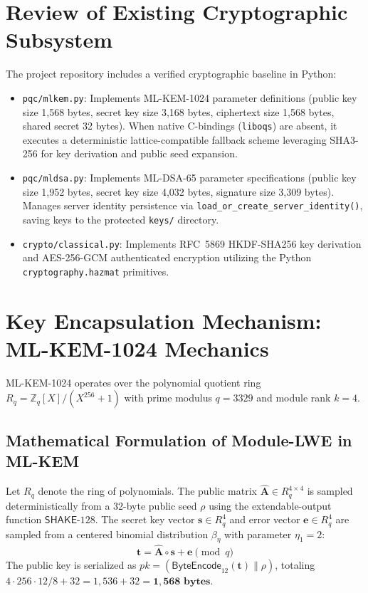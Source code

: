 \section{Review of Existing Cryptographic Subsystem}
\label{sec:existing_crypto_review}

The project repository includes a verified cryptographic baseline in Python:
\begin{itemize}
    \item \texttt{pqc/mlkem.py}: Implements ML-KEM-1024 parameter definitions (public key size 1,568 bytes, secret key size 3,168 bytes, ciphertext size 1,568 bytes, shared secret 32 bytes). When native C-bindings (\texttt{liboqs}) are absent, it executes a deterministic lattice-compatible fallback scheme leveraging SHA3-256 for key derivation and public seed expansion.
    \item \texttt{pqc/mldsa.py}: Implements ML-DSA-65 parameter specifications (public key size 1,952 bytes, secret key size 4,032 bytes, signature size 3,309 bytes). Manages server identity persistence via \texttt{load\_or\_create\_server\_identity()}, saving keys to the protected \texttt{keys/} directory.
    \item \texttt{crypto/classical.py}: Implements RFC~5869 HKDF-SHA256 key derivation and AES-256-GCM authenticated encryption utilizing the Python \texttt{cryptography.hazmat} primitives.
\end{itemize}

\section{Key Encapsulation Mechanism: ML-KEM-1024 Mechanics}
\label{sec:mlkem_detailed_mechanics}

ML-KEM-1024 operates over the polynomial quotient ring $R_q = \mathbb{Z}_q[X] / (X^{256} + 1)$ with prime modulus $q = 3329$ and module rank $k = 4$.

\subsection{Mathematical Formulation of Module-LWE in ML-KEM}
Let $R_q$ denote the ring of polynomials. The public matrix $\hat{\mathbf{A}} \in R_q^{4 \times 4}$ is sampled deterministically from a 32-byte public seed $\rho$ using the extendable-output function $\mathsf{SHAKE}\text{-}128$. The secret key vector $\mathbf{s} \in R_q^4$ and error vector $\mathbf{e} \in R_q^4$ are sampled from a centered binomial distribution $\beta_\eta$ with parameter $\eta_1 = 2$:
\begin{equation}
\mathbf{t} = \hat{\mathbf{A}} \circ \mathbf{s} + \mathbf{e} \pmod q
\end{equation}
The public key is serialized as $pk = (\mathsf{ByteEncode}_{12}(\mathbf{t}) \parallel \rho)$, totaling $4 \cdot 256 \cdot 12 / 8 + 32 = 1,536 + 32 = \mathbf{1,568\text{ bytes}}$.

